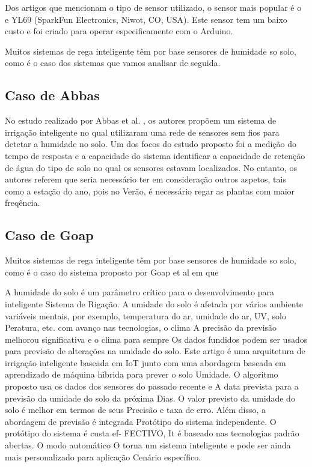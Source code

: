 \documentclass[conference]{IEEEtran}
\begin{document}
Dos artigos que mencionam o tipo de sensor utilizado, o sensor mais popular é o 
e YL69 (SparkFun Electronics, Niwot, CO, USA). Este sensor tem um baixo custo e 
foi criado para operar especificamente com o Arduino. \cite{garcia2020iot}

Muitos sistemas de rega inteligente têm por base sensores de humidade so solo, como 
é o caso dos sistemas que vamos analisar de seguida.

\subsection{Caso de Abbas}

No estudo realizado por Abbas et al. \cite{abbas2014smart}, os autores propõem 
um sistema de irrigação inteligente no qual utilizaram uma rede de sensores sem 
fios para detetar a humidade no solo. Um dos focos do estudo proposto foi a medição 
do tempo de resposta e a capacidade do sistema identificar a capacidade de 
retenção de água do tipo de solo no qual os sensores estavam localizados. 
No entanto, os autores referem que seria necessário ter em consideração outros 
aspetos, tais como a estação do ano, pois no Verão, é necessário regar as plantas 
com maior freqência.

\subsection{Caso de Goap}

Muitos sistemas de rega inteligente têm por base sensores de humidade so solo, como 
é o caso do sistema proposto por Goap et al \cite{goap2018an} em que 

A humidade do solo é um parâmetro crítico para o desenvolvimento para inteligente
Sistema de Rigação. A umidade do solo é afetada por vários ambiente
variáveis mentais, por exemplo, temperatura do ar, umidade do ar, UV, solo
Peratura, etc. com avanço nas tecnologias, o clima
A precisão da previsão melhorou significativa e o clima para sempre
Os dados fundidos podem ser usados para previsão de alterações na umidade do solo.
Este artigo é uma arquitetura de irrigação inteligente baseada em IoT junto
com uma abordagem baseada em aprendizado de máquina híbrida para prever o solo
Umidade. O algoritmo proposto usa os dados dos sensores do passado recente e
A data prevista para a previsão da umidade do solo da próxima
Dias. O valor previsto da umidade do solo é melhor em termos de seus
Precisão e taxa de erro. Além disso, a abordagem de previsão é integrada
Protótipo do sistema independente. O protótipo do sistema é custa ef-
FECTIVO, It é baseado nas tecnologias padrão abertas. O modo automático
O torna um sistema inteligente e pode ser ainda mais personalizado para aplicação
Cenário específico.
\end{document}

